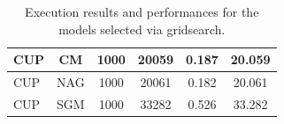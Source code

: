 \begin{table}[H]
\begin{center}
{\begin{tabular}{|P{2.cm}||c|c|c|c|c|}
         \hline\hline
         CUP & CM & 1000 & 20059 & 0.187 & 20.059 \\
         \hline
         CUP & NAG & 1000 & 20061 & 0.182 & 20.061 \\
         \hline
         CUP & SGM & 1000 & 33282 & 0.526 & 33.282 \\
         \hline
    \end{tabular}}
    \label{tab:gridSGM}
    \end{center}
    \caption{Execution results and performances for the models selected via gridsearch.}
    \label{tab:stat_CUP}
\end{table}